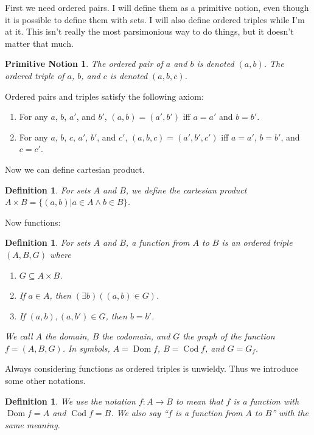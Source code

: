 \documentclass[12pt]{article}
\newcounter{axmmain}
\newenvironment{axm}
 {\stepcounter{axmmain}\axminner}
 {\endaxminner}
\DeclareMathOperator{\Dom}{Dom}
\DeclareMathOperator{\Cod}{Cod}
\newcounter{prmc}
\newcounter{dfnc}
\newtheorem{prm}[prmc]{Primitive Notion}
\newtheorem{dfn}[dfnc]{Definition}
\begin{document}
First we need ordered pairs.  I will define them as a primitive
notion, even though it is possible to define them with sets.  I will
also define ordered triples while I'm at it.  This isn't really the
most parsimonious way to do things, but it doesn't matter that much.

\begin{prm}
  The ordered pair of $a$ and $b$ is denoted $(a,b)$.  The ordered
  triple of $a$, $b$, and $c$ is denoted $(a,b,c)$.
\end{prm}

Ordered pairs and triples satisfy the following axiom:

\begin{axm}\label{axm:ord}
  \begin{enumerate}[label=\alph*)]
  \item  For any $a$, $b$, $a'$, and $b'$, $(a,b)=(a',b')$ iff $a=a'$ and $b=b'$.
  \item  For any $a$, $b$, $c$, $a'$, $b'$, and $c'$, $(a,b,c)=(a',b',c')$ iff $a=a'$, $b=b'$, and $c=c'$.
  \end{enumerate}
\end{axm}

Now we can define cartesian product.

\begin{dfn}\label{dfn:cart}
  For sets $A$ and $B$, we define the cartesian product $A\times
  B=\{(a,b)|a\in A \wedge b\in B\}$.
\end{dfn}

Now functions:

\begin{dfn}\label{dfn:fun}
  For sets $A$ and $B$, a function from $A$ to $B$ is an ordered
  triple $(A,B,G)$ where
  \begin{enumerate}[label=\alph*)]
  \item $G\subseteq A\times B$.
  \item If $a\in A$, then $(\exists b)((a,b)\in G)$.
  \item If $(a,b),(a,b')\in G$, then $b=b'$.
  \end{enumerate}
  We call $A$ the domain, $B$ the codomain, and $G$ the graph of the
  function $f=(A,B,G)$.  In symbols, $A=\Dom f$, $B=\Cod f$, and
  $G=G_f$.
\end{dfn}

Always considering functions as ordered triples is unwieldy.  Thus we
introduce some other notations.

\begin{dfn}
  We use the notation $f:A\rightarrow B$ to mean that $f$ is a
  function with $\Dom f=A$ and $\Cod f=B$.  We also say ``$f$ is a
  function from $A$ to $B$'' with the same meaning.
\end{dfn}
\end{document}
